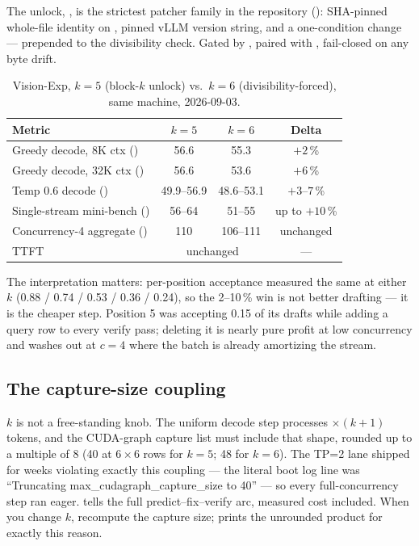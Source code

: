 The unlock, , is the
strictest patcher family in the repository (): SHA-pinned
whole-file identity on , pinned vLLM version
string, and a one-condition change --- 
prepended to the divisibility check. Gated by
, paired with
, fail-closed on any byte drift.

\begin{table}[htbp]
\centering\small
\caption{Vision-Exp, $k{=}5$ (block-$k$ unlock) vs.\ $k{=}6$
(divisibility-forced), same machine, 2026-09-03.}
\label{tab:specdecode-blockk}
\begin{tabular}{lccc}
\toprule
Metric & $k{=}5$ & $k{=}6$ & Delta \\
\midrule
Greedy decode, 8K ctx (\tokspersec{}) & 56.6 & 55.3 & $+2$\,\% \\
Greedy decode, 32K ctx (\tokspersec{}) & 56.6 & 53.6 & $+6$\,\% \\
Temp 0.6 decode (\tokspersec{}) & 49.9--56.9 & 48.6--53.1 & $+3$--$7$\,\% \\
Single-stream mini-bench (\tokspersec{}) & 56--64 & 51--55 & up to $+10$\,\% \\
Concurrency-4 aggregate (\tokspersec{}) & 110 & 106--111 & unchanged \\
TTFT & \multicolumn{2}{c}{unchanged} & --- \\
\bottomrule
\end{tabular}
\end{table}

The interpretation matters: per-position acceptance measured the same at
either $k$ (0.88 / 0.74 / 0.53 / 0.36 / 0.24), so the 2--10\,\% win is not better
drafting --- it is the cheaper step. Position 5 was accepting 0.15 of its
drafts while adding a query row to every verify pass; deleting it is nearly
pure profit at low concurrency and washes out at $c{=}4$ where the batch is
already amortizing the stream.

\subsection{The capture-size coupling}

$k$ is not a free-standing knob. The uniform decode step processes
 $\times (k{+}1)$ tokens, and the CUDA-graph capture list
must include that shape, rounded up to a multiple of 8 (40 at
$6\times 6$ rows for $k{=}5$; 48 for $k{=}6$). The TP=2 lane shipped for
weeks violating exactly this coupling --- the literal boot log line was
``Truncating max\_cudagraph\_capture\_size to 40'' --- so every
full-concurrency step ran eager.  tells the full
predict--fix--verify arc, measured cost included. When you change $k$,
recompute the capture size; 
prints the unrounded product for exactly this reason.

